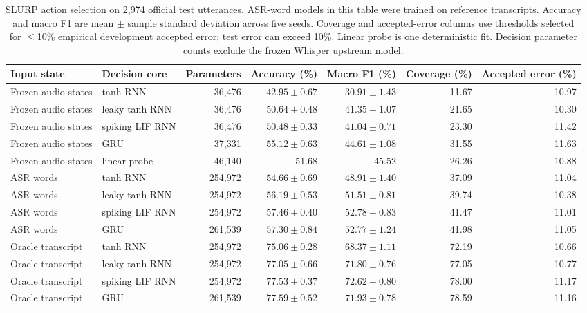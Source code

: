 \documentclass[conference]{IEEEtran}
\begin{document}
\begin{table}[t]
\caption{SLURP action selection on 2,974 official test utterances. ASR-word models in this table were trained on reference transcripts. Accuracy and macro F1 are mean $\pm$ sample standard deviation across five seeds. Coverage and accepted-error columns use thresholds selected for $\leq$10\% empirical development accepted error; test error can exceed 10\%. Linear probe is one deterministic fit. Decision parameter counts exclude the frozen Whisper upstream model.}
\label{tab:slurp}
\centering\scriptsize
\begin{tabular}{llrrrrr}
\toprule
Input state & Decision core & Parameters & Accuracy (\%) & Macro F1 (\%) & Coverage (\%) & Accepted error (\%)\\
\midrule
Frozen audio states & tanh RNN & 36,476 & $42.95\pm0.67$ & $30.91\pm1.43$ & 11.67 & 10.97\\
Frozen audio states & leaky tanh RNN & 36,476 & $50.64\pm0.48$ & $41.35\pm1.07$ & 21.65 & 10.30\\
Frozen audio states & spiking LIF RNN & 36,476 & $50.48\pm0.33$ & $41.04\pm0.71$ & 23.30 & 11.42\\
Frozen audio states & GRU & 37,331 & $55.12\pm0.63$ & $44.61\pm1.08$ & 31.55 & 11.63\\
Frozen audio states & linear probe & 46,140 & 51.68 & 45.52 & 26.26 & 10.88\\
\midrule
ASR words & tanh RNN & 254,972 & $54.66\pm0.69$ & $48.91\pm1.40$ & 37.09 & 11.04\\
ASR words & leaky tanh RNN & 254,972 & $56.19\pm0.53$ & $51.51\pm0.81$ & 39.74 & 10.38\\
ASR words & spiking LIF RNN & 254,972 & $57.46\pm0.40$ & $52.78\pm0.83$ & 41.47 & 11.01\\
ASR words & GRU & 261,539 & $57.30\pm0.84$ & $52.77\pm1.24$ & 41.98 & 11.05\\
\midrule
Oracle transcript & tanh RNN & 254,972 & $75.06\pm0.28$ & $68.37\pm1.11$ & 72.19 & 10.66\\
Oracle transcript & leaky tanh RNN & 254,972 & $77.05\pm0.66$ & $71.80\pm0.76$ & 77.05 & 10.77\\
Oracle transcript & spiking LIF RNN & 254,972 & $77.53\pm0.37$ & $72.62\pm0.80$ & 78.00 & 11.17\\
Oracle transcript & GRU & 261,539 & $77.59\pm0.52$ & $71.93\pm0.78$ & 78.59 & 11.16\\
\bottomrule
\end{tabular}
\end{table}
\end{document}
